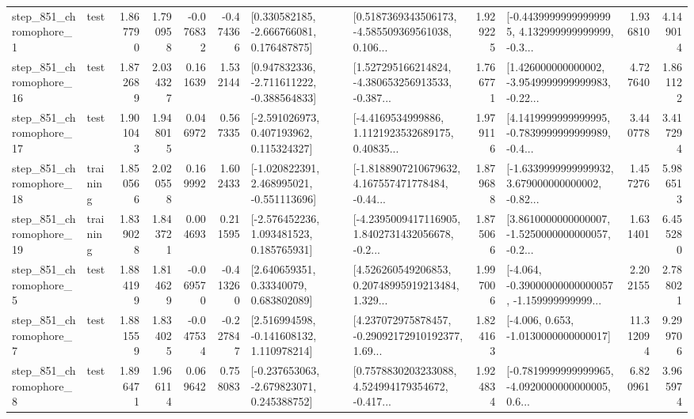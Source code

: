 \begin{tabular}{llrrrrllrlrr}
   step\_851\_chromophore\_1 &      test &      1.867790 &    1.790958 &     -0.076832 & -0.474366 &    [0.330582185, -2.666766081, 0.176487875] &  [0.5187369343506173, -4.585509369561038, 0.106... &       1.929225 &  [-0.44399999999999995, 4.132999999999999, -0.3... &            1.936810 &          4.149014 \\
  step\_851\_chromophore\_16 &      test &      1.872689 &    2.034327 &      0.161639 &  1.532144 &   [0.947832336, -2.711611222, -0.388564833] &  [1.527295166214824, -4.380653256913533, -0.387... &       1.766771 &  [1.426000000000002, -3.9549999999999983, -0.22... &            4.727640 &          1.861122 \\
  step\_851\_chromophore\_17 &      test &      1.901043 &    1.948015 &      0.046972 &  0.567335 &    [-2.591026973, 0.407193962, 0.115324327] &  [-4.4169534999886, 1.1121923532689175, 0.40835... &       1.979116 &  [4.1419999999999995, -0.7839999999999989, -0.4... &            3.440778 &          3.417294 \\
  step\_851\_chromophore\_18 &  training &      1.850566 &    2.020558 &      0.169992 &  1.602433 &   [-1.020822391, 2.468995021, -0.551113696] &  [-1.8188907210679632, 4.167557471778484, -0.44... &       1.879688 &  [-1.6339999999999932, 3.679000000000002, -0.82... &            1.457276 &          5.986513 \\
  step\_851\_chromophore\_19 &  training &      1.839028 &    1.843721 &      0.004693 &  0.211595 &    [-2.576452236, 1.093481523, 0.185765931] &  [-4.2395009417116905, 1.8402731432056678, -0.2... &       1.875066 &  [3.8610000000000007, -1.5250000000000057, -0.2... &            1.631401 &          6.455280 \\
   step\_851\_chromophore\_5 &      test &      1.884199 &    1.814629 &     -0.069570 & -0.413260 &      [2.640659351, 0.33340079, 0.683802089] &  [4.526260549206853, 0.20748995919213484, 1.329... &       1.997006 &  [-4.064, -0.39000000000000057, -1.159999999999... &            2.202155 &          2.788021 \\
   step\_851\_chromophore\_7 &      test &      1.881559 &    1.834025 &     -0.047534 & -0.227847 &    [2.516994598, -0.141608132, 1.110978214] &  [4.237072975878457, -0.29092172910192377, 1.69... &       1.824163 &               [-4.006, 0.653, -1.0130000000000017] &           11.312094 &          9.299706 \\
   step\_851\_chromophore\_8 &      test &      1.896471 &    1.966114 &      0.069642 &  0.758083 &   [-0.237653063, -2.679823071, 0.245388752] &  [0.7578830203233088, 4.524994179354672, -0.417... &       1.924834 &  [-0.7819999999999965, -4.0920000000000005, 0.6... &            6.820961 &          3.965974 \\

\end{tabular}
